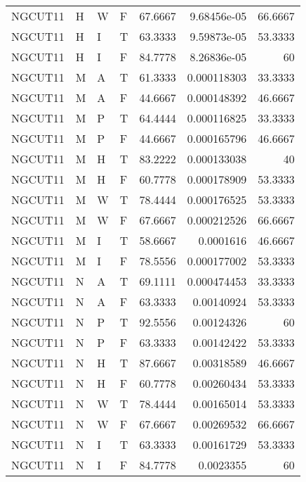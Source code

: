 \begin{table}[htb!]
{\begin{tabular}{llllrrr}
            NGCUT11  & H     & W     & F          & 67.6667    & 9.68456e-05 & 66.6667  \\
            NGCUT11  & H     & I     & T          & 63.3333    & 9.59873e-05 & 53.3333  \\
            NGCUT11  & H     & I     & F          & 84.7778    & 8.26836e-05 & 60       \\
            NGCUT11  & M     & A     & T          & 61.3333    & 0.000118303 & 33.3333  \\
            NGCUT11  & M     & A     & F          & 44.6667    & 0.000148392 & 46.6667  \\
            NGCUT11  & M     & P     & T          & 64.4444    & 0.000116825 & 33.3333  \\
            NGCUT11  & M     & P     & F          & 44.6667    & 0.000165796 & 46.6667  \\
            NGCUT11  & M     & H     & T          & 83.2222    & 0.000133038 & 40       \\
            NGCUT11  & M     & H     & F          & 60.7778    & 0.000178909 & 53.3333  \\
            NGCUT11  & M     & W     & T          & 78.4444    & 0.000176525 & 53.3333  \\
            NGCUT11  & M     & W     & F          & 67.6667    & 0.000212526 & 66.6667  \\
            NGCUT11  & M     & I     & T          & 58.6667    & 0.0001616   & 46.6667  \\
            NGCUT11  & M     & I     & F          & 78.5556    & 0.000177002 & 53.3333  \\
            NGCUT11  & N     & A     & T          & 69.1111    & 0.000474453 & 33.3333  \\
            NGCUT11  & N     & A     & F          & 63.3333    & 0.00140924  & 53.3333  \\
            NGCUT11  & N     & P     & T          & 92.5556    & 0.00124326  & 60       \\
            NGCUT11  & N     & P     & F          & 63.3333    & 0.00142422  & 53.3333  \\
            NGCUT11  & N     & H     & T          & 87.6667    & 0.00318589  & 46.6667  \\
            NGCUT11  & N     & H     & F          & 60.7778    & 0.00260434  & 53.3333  \\
            NGCUT11  & N     & W     & T          & 78.4444    & 0.00165014  & 53.3333  \\
            NGCUT11  & N     & W     & F          & 67.6667    & 0.00269532  & 66.6667  \\
            NGCUT11  & N     & I     & T          & 63.3333    & 0.00161729  & 53.3333  \\
            NGCUT11  & N     & I     & F          & 84.7778    & 0.0023355   & 60       \\
            \hline
        \end{tabular}
    }{
    }
\end{table} 
